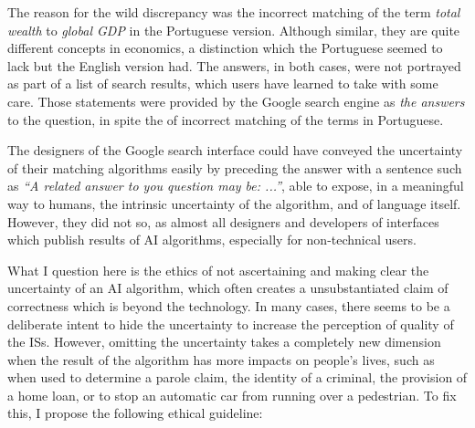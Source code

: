 \documentclass{article}
\begin{document}
The reason for the wild discrepancy was the incorrect matching of the term \emph{total wealth} to \emph{global GDP} in the Portuguese version. Although similar, they are quite different concepts in economics, a distinction which the Portuguese seemed to lack but the English version had. %
The answers, in both cases, were not portrayed as part of a list of search results, which users have learned to take with some care. Those statements were provided by the Google search engine as \emph{the answers} to the question, in spite the of incorrect matching of the terms in Portuguese. %

The designers of the Google search interface could have conveyed the uncertainty of their matching algorithms easily by preceding the answer with a sentence such as \emph{``A related answer to you question may be: ...''}, able to expose, in a meaningful way to humans, the intrinsic uncertainty of the algorithm, and of language itself. However, they did not so, as almost all designers and developers of interfaces which publish results of AI algorithms, especially for non-technical users.

What I question here is the ethics of not ascertaining and making clear the uncertainty of an AI algorithm, which often creates a unsubstantiated claim of correctness which is beyond the technology. In many cases, there seems to be a deliberate intent to hide the uncertainty to increase the perception of quality of the ISs. %
However, omitting the uncertainty takes a completely new dimension when the result of the algorithm has more impacts on people's lives, such as when used to determine a parole claim, the identity of a criminal, the provision of a home loan, or to stop an automatic car from running over a pedestrian. %
To fix this, I propose the following ethical guideline:
\end{document}
